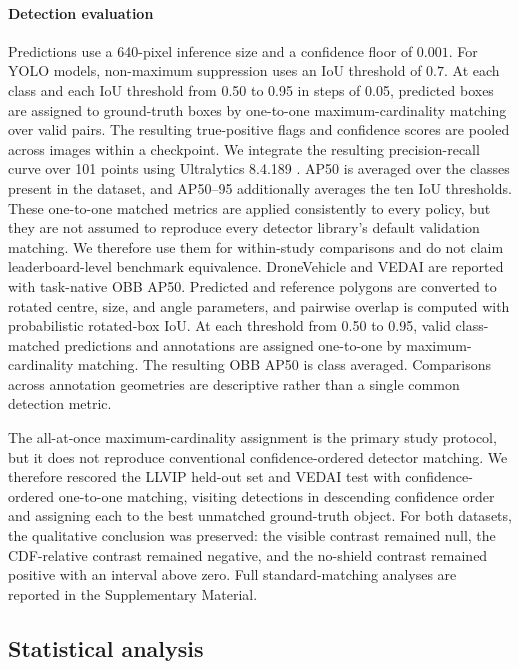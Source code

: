 \documentclass[preprint,11pt]{elsarticle}
\begin{document}
\paragraph{Detection evaluation}
Predictions use a 640-pixel inference size and a confidence floor of \(0.001\).
For YOLO models, non-maximum suppression uses an IoU threshold of \(0.7\). At
each class and each IoU threshold from 0.50 to 0.95 in steps of 0.05, predicted
boxes are assigned to ground-truth boxes by one-to-one maximum-cardinality
matching over valid pairs. The resulting true-positive flags and confidence
scores are pooled across images within a checkpoint. We integrate the resulting
precision-recall curve over 101 points using Ultralytics 8.4.189
\cite{jocher2026ultralytics}. AP50 is averaged over the classes present in the
dataset, and AP50--95 additionally averages the ten IoU thresholds. These
one-to-one matched metrics are applied consistently to every policy, but they
are not assumed to reproduce every detector library's default validation
matching. We therefore use them for within-study comparisons and do not claim
leaderboard-level benchmark equivalence. DroneVehicle and VEDAI are reported
with task-native OBB AP50. Predicted and reference polygons are converted
to rotated centre, size, and angle parameters, and pairwise overlap is computed
with probabilistic rotated-box IoU. At each threshold from 0.50 to 0.95, valid
class-matched predictions and annotations are assigned one-to-one by
maximum-cardinality matching. The resulting OBB AP50 is class averaged.
Comparisons across annotation geometries are descriptive rather than a single
common detection metric.

The all-at-once maximum-cardinality assignment is the primary study protocol,
but it does not reproduce conventional confidence-ordered detector matching.
We therefore rescored the LLVIP held-out set and VEDAI test with
confidence-ordered one-to-one matching, visiting detections in descending
confidence order and assigning each to the best unmatched ground-truth object.
For both datasets, the qualitative
conclusion was preserved: the visible contrast remained null, the CDF-relative
contrast remained negative, and the no-shield contrast remained positive with
an interval above zero. Full standard-matching analyses are reported in the
Supplementary Material.

\subsection{Statistical analysis}
\end{document}
